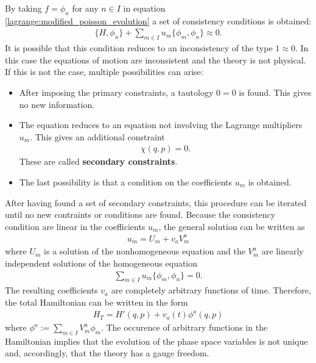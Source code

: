     \begin{property}
        By taking $f=\phi_n$ for any $n\in I$ in equation \ref{lagrange:modified_poisson_evolution} a set of consistency conditions is obtained:
        \begin{gather}
            \{H,\phi_n\} + \sum_{m\in I}u_m\{\phi_m,\phi_n\} \approx 0.
        \end{gather}
        It is possible that this condition reduces to an inconsistency of the type $1\approx0$. In this case the equations of motion are inconsistent and the theory is not physical. If this is not the case, multiple possibilities can arise:
        \begin{itemize}
            \item After imposing the primary constraints, a tautology $0=0$ is found. This gives no new information.
            \item The equation reduces to an equation not involving the Lagrange multipliers $u_m$. This gives an additional constraint
                \begin{gather}
                    \chi(q,p)=0.
                \end{gather}
                These are called \textbf{secondary constraints}.
            \item The last possibility is that a condition on the coefficients $u_m$ is obtained.
        \end{itemize}
        After having found a set of secondary constraints, this procedure can be iterated until no new contraints or conditions are found. Because the consistency condition are linear in the coefficients $u_m$, the general solution can be written as
        \begin{gather}
            u_m = U_m + v_aV^a _m
        \end{gather}
        where $U_m$ is a solution of the nonhomogeneous equation and the $V^a_m$ are linearly independent solutions of the homogeneous equation
        \begin{gather}
            \sum_{m\in I}u_m\{\phi_m,\phi_n\} = 0.
        \end{gather}
        The resulting coefficients $v_a$ are completely arbitrary functions of time. Therefore, the total Hamiltonian can be written in the form
        \begin{gather}
            H_T = H'(q,p) + v_a(t)\phi^a(q,p)
        \end{gather}
        where $\phi^a := \sum_{m\in I}V^a_m\phi_m$. The occurence of arbitrary functions in the Hamiltonian implies that the evolution of the phase space variables is not unique and, accordingly, that the theory has a gauge freedom.
    \end{property}

